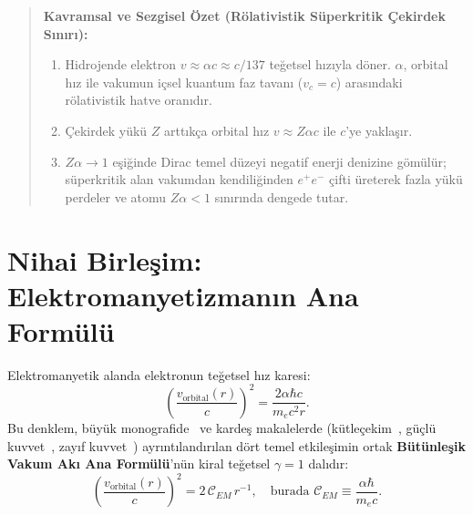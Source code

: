 \documentclass[11pt,a4paper]{article}
\begin{document}
\begin{quote}
    \small
    \textbf{Kavramsal ve Sezgisel Özet (Rölativistik Süperkritik Çekirdek Sınırı):}
    \begin{enumerate}
        \item Hidrojende elektron $v \approx \alpha c \approx c/137$ teğetsel hızıyla döner. $\alpha$, orbital hız ile vakumun içsel kuantum faz tavanı ($v_c = c$) arasındaki rölativistik hatve oranıdır.
        \item Çekirdek yükü $Z$ arttıkça orbital hız $v \approx Z\alpha c$ ile $c$'ye yaklaşır.
        \item $Z \alpha \to 1$ eşiğinde Dirac temel düzeyi negatif enerji denizine gömülür; süperkritik alan vakumdan kendiliğinden $e^+ e^-$ çifti üreterek fazla yükü perdeler ve atomu $Z\alpha < 1$ sınırında dengede tutar.
    \end{enumerate}
\end{quote}

\section{Nihai Birleşim: Elektromanyetizmanın Ana Formülü}
\label{sec:ana_formul_em}

Elektromanyetik alanda elektronun teğetsel hız karesi:
\begin{equation}
    \left( \frac{v_{\mathrm{orbital}}(r)}{c} \right)^2 = \frac{2 \alpha \hbar c}{m_e c^2 r}.
    \label{eq:em_master_tr}
\end{equation}
Bu denklem, büyük monografide~\cite{main_paper} ve kardeş makalelerde (kütleçekim~\cite{paper1}, güçlü kuvvet~\cite{paper3}, zayıf kuvvet~\cite{paper4}) ayrıntılandırılan dört temel etkileşimin ortak \textbf{Bütünleşik Vakum Akı Ana Formülü}'nün kiral teğetsel $\gamma = 1$ dalıdır:
\begin{equation}
    \boxed{ \left( \frac{v_{\mathrm{orbital}}(r)}{c} \right)^2 = 2 \, \mathcal{C}_{EM} \, r^{-1}, \quad \text{burada } \mathcal{C}_{EM} \equiv \frac{\alpha \hbar}{m_e c}. }
\end{equation}
\end{document}
